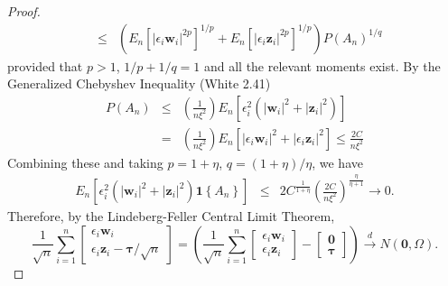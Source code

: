 \documentclass[12pt]{article}\usepackage[]{graphicx}\usepackage[]{color}
\theoremstyle{definition}
\begin{document}
\begin{proof}
\begin{eqnarray*}
    &\leq& \left(E_n \left[\left|\epsilon_i \mathbf{w}_i\right|^{2p} \right]^{1/p} + E_n\left[ \left|\epsilon_i \mathbf{z}_i\right|^{2p}\right]^{1/p}\right)P(A_n)^{1/q}
  \end{eqnarray*}
provided that $p>1$, $1/p + 1/q = 1$ and all the relevant moments exist. By the Generalized Chebyshev Inequality (White 2.41) 
    \begin{eqnarray*}
      P(A_n) &\leq& \left( \frac{1}{n\xi^2}\right) E_n\left[\epsilon_i^2 \left(\left|\mathbf{w}_i \right|^2 + \left|\mathbf{z}_i \right|^2\right) \right]\\
      &=& \left( \frac{1}{n\xi^2}\right) E_n\left[\left|\epsilon_i \mathbf{w}_i \right|^2 + \left| \epsilon_i \mathbf{z}_i \right|^2\right] \leq \frac{2C}{n\xi^2}
    \end{eqnarray*}
Combining these and taking $p = 1+\eta$, $q = (1+\eta)/\eta$, we have
  \begin{eqnarray*}
  E_n \left[\epsilon_i^2 \left(\left|\mathbf{w}_i \right|^2 + \left| \mathbf{z}_i\right|^2 \right) \mathbf{1} \left\{A_n\right\}\right] &\leq& 2C^{\frac{1}{1+\eta}} \left(\frac{2C}{n\xi^2} \right)^{\frac{\eta}{\eta+1}} \rightarrow 0.
  \end{eqnarray*}
Therefore, by the Lindeberg-Feller Central Limit Theorem,
  $$\frac{1}{\sqrt{n}} \sum_{i=1}^n \left[\begin{array}{c} \epsilon_i \mathbf{w}_i \\ \epsilon_i \mathbf{z}_i - \boldsymbol{\tau}/\sqrt{n}\end{array} \right] = \left(\frac{1}{\sqrt{n}} \sum_{i=1}^n \left[\begin{array}{c} \epsilon_i \mathbf{w}_i \\ \epsilon_i \mathbf{z}_i \end{array} \right] - \left[\begin{array}{c}\mathbf{0}\\ \boldsymbol{\tau} \end{array} \right] \right)\overset{d}{\rightarrow} N(\mathbf{0}, \Omega).$$
\end{proof}
\end{document}
